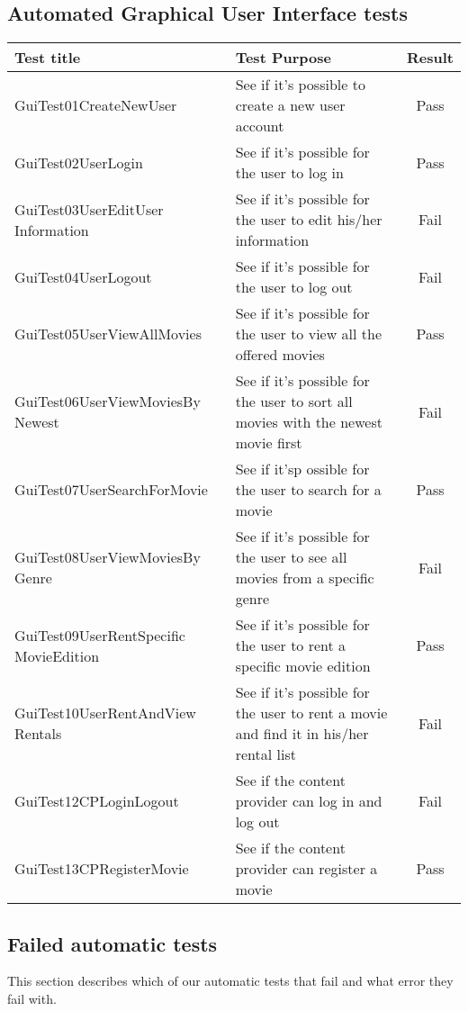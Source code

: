 \subsection{Automated Graphical User Interface tests}
\label{Appendix_Test_Table_GUI}
\begin{centering}
\begin{longtable}{| p{5 cm} | p{9 cm} | c |}
\hline
Test title & Test Purpose & Result\\
\hline
GuiTest01CreateNewUser & See if it's possible to create a new user account & Pass\\
\hline
GuiTest02UserLogin & See if it's possible for the user to log in & Pass\\
\hline
GuiTest03UserEditUser Information & See if it's possible for the user to edit his/her information & Fail\\
\hline
GuiTest04UserLogout & See if it's possible for the user to log out & Fail\\
\hline
GuiTest05UserViewAllMovies & See if it's possible for the user to view all the offered movies & Pass\\
\hline
GuiTest06UserViewMoviesBy Newest & See if it's possible for the user to sort all movies with the newest movie first & Fail\\
\hline
GuiTest07UserSearchForMovie & See if it'sp ossible for the user to search for a movie & Pass\\
\hline
GuiTest08UserViewMoviesBy Genre & See if it's possible for the user to see all movies from a specific genre & Fail\\
\hline
GuiTest09UserRentSpecific MovieEdition & See if it's possible for the user to rent a specific movie edition & Pass\\
\hline
GuiTest10UserRentAndView Rentals & See if it's possible for the user to rent a movie and find it in his/her rental list & Fail\\
\hline
GuiTest12CPLoginLogout & See if the content provider can log in and log out & Fail\\
\hline
GuiTest13CPRegisterMovie & See if the content provider can register a movie & Pass\\
\hline
\end{longtable}
\end{centering}

\subsection{Failed automatic tests}
\label{Appendix_Test_Table_FailedTests}
This section describes which of our automatic tests that fail and what error they fail with.


